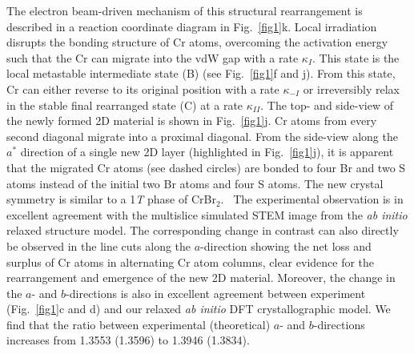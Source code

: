 \documentclass[aps,prl,showpacs,twocolumn,superscriptaddress,floatfix]{revtex4-2}
\begin{document}
The electron beam-driven mechanism of this structural rearrangement is described in a reaction coordinate diagram in Fig.~\ref{fig1}k. Local irradiation disrupts the bonding structure of Cr atoms, overcoming the activation energy such that the Cr can migrate into the vdW gap with a rate $\kappa_{I}$. This state is the local metastable intermediate state (B) (see Fig.~\ref{fig1}f and j). From this state, Cr can either reverse to its original position with a rate $\kappa_{-I}$ or irreversibly relax in the stable final rearranged state (C) at a rate $\kappa_{II}$. The top- and side-view of the newly formed 2D material is shown in Fig.~\ref{fig1}j. Cr atoms from every second diagonal migrate into a proximal diagonal. %
From the side-view along the $a^{*}$ direction of a single new 2D layer (highlighted in Fig.~\ref{fig1}j), it is apparent that the migrated Cr atoms (see dashed circles) are bonded to four Br and two S atoms instead of the initial two Br atoms and four S atoms. The new crystal symmetry is similar to a 1\textit{T} phase of CrBr$_{2}$.~\cite{Kulish.2017} The experimental observation is in excellent agreement with the multislice simulated STEM image from the \textit{ab initio} relaxed structure model. The corresponding change in contrast can also directly be observed in the line cuts along the $a$-direction showing the net loss and surplus of Cr atoms in alternating Cr atom columns, clear evidence for the rearrangement and emergence of the new 2D material. Moreover, the change in the $a$- and $b$-directions is also in excellent agreement between experiment (Fig.~\ref{fig1}c and d) and our relaxed \textit{ab initio} DFT crystallographic model. We find that the ratio between experimental (theoretical) $a$- and $b$-directions increases from 1.3553 (1.3596) to 1.3946 (1.3834).
\end{document}
